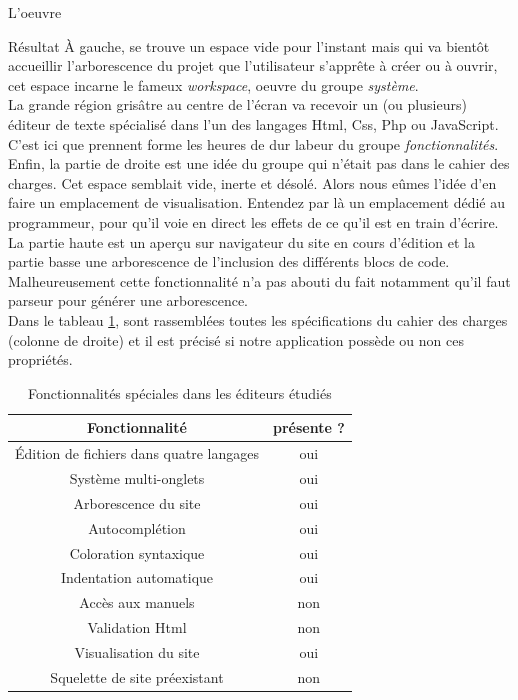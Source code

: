 \documentclass[a4paper, 12pt]{report}
\begin{document}
\begin{part}{L'oeuvre}
\begin{chapter}{Résultat}
			À gauche, se trouve un espace vide pour l'instant mais qui va bientôt accueillir l'arborescence du projet que l'utilisateur
			s'apprête à créer ou à ouvrir, cet espace incarne le fameux \emph{workspace}, oeuvre du groupe \emph{système}.\\


			La grande région grisâtre au centre de l'écran va recevoir un (ou plusieurs) éditeur de texte spécialisé dans l'un des langages
			\gls{Html}, \gls{Css}, \gls{Php} ou \gls{JavaScript}. C'est ici que prennent forme les heures de dur labeur du groupe
			\emph{fonctionnalités}.\\


			Enfin, la partie de droite est une idée du groupe qui n'était pas dans le cahier des charges. Cet espace semblait vide, inerte et désolé.
			Alors nous eûmes l'idée d'en faire un emplacement de visualisation. Entendez par là un emplacement dédié au programmeur, pour qu'il
			voie en direct les effets de ce qu'il est en train d'écrire.\\
			La partie haute est un aperçu sur navigateur du site en cours d'édition et la partie basse une arborescence de l'inclusion des
			différents blocs de code.\\
			Malheureusement cette fonctionnalité n'a pas abouti du fait notamment qu'il faut \gls{parseur} pour générer une arborescence.\\


			Dans le tableau \ref{raisin}, sont rassemblées toutes les spécifications du cahier des charges (colonne de droite) et il est
			précisé si notre application possède ou non ces propriétés.\\
			\begin{table}[h]
			\caption{\label{raisin} Fonctionnalités spéciales dans les éditeurs étudiés}
			\centering
				\begin{tabular}{|c||c|} %
				  \hline
				  Fonctionnalité & présente ? \\
				  \hline
				  Édition de fichiers dans quatre langages & oui \\
				  Système multi-onglets & oui \\
				  Arborescence du site & oui \\
				  Autocomplétion & oui \\
				  Coloration syntaxique & oui \\
				  Indentation automatique & oui \\
				  Accès aux manuels & non \\
				  Validation \gls{Html} & non \\
				  Visualisation du site & oui \\
				  Squelette de site préexistant & non \\
				  \hline
				\end{tabular}
			\end{table}~\\


\end{chapter}
\end{part}
\end{document}
